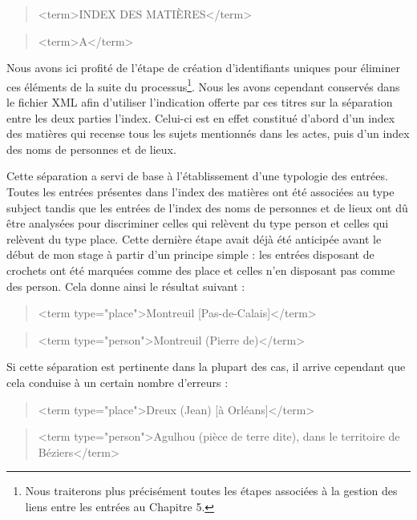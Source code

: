 \documentclass[a4paper,12pt,twoside]{book}
\begin{document}
	\begin{quotation}
		<term>INDEX DES MATIÈRES</term>
	\end{quotation}

	\begin{quotation}
		<term>A</term>
	\end{quotation}

	\noindent Nous avons ici profité de l'étape de création d'identifiants uniques pour éliminer ces éléments de la suite du processus\footnote{Nous traiterons plus précisément toutes les étapes associées à la gestion des liens entre les entrées au Chapitre 5.}. Nous les avons cependant conservés dans le fichier XML afin d'utiliser l'indication offerte par ces titres sur la séparation entre les deux parties l'index. Celui-ci est en effet constitué d'abord d'un index des matières qui recense tous les sujets mentionnés dans les actes, puis d'un index des noms de personnes et de lieux. 
	
	Cette séparation a servi de base à l'établissement d'une typologie des entrées. Toutes les entrées présentes dans l'index des matières ont été associées au type \og subject\fg{} tandis que les entrées de l'index des noms de personnes et de lieux ont dû être analysées pour discriminer celles qui relèvent du type \og person\fg{} et celles qui relèvent du type \og place\fg{}. Cette dernière étape avait déjà été anticipée avant le début de mon stage à partir d'un principe simple : les entrées disposant de crochets ont été marquées comme des \og place\fg{} et celles n'en disposant pas comme des \og person\fg{}. Cela donne ainsi le résultat suivant : 
	
	\begin{quotation}
		<term type="place">Montreuil [Pas-de-Calais]</term>
	\end{quotation}

	\begin{quotation}
		<term type="person">Montreuil (Pierre de)</term>
	\end{quotation}

	\noindent Si cette séparation est pertinente dans la plupart des cas, il arrive cependant que cela conduise à un certain nombre d'erreurs :
	
	\begin{quotation}
		<term type="place">Dreux (Jean) [à Orléans]</term>
	\end{quotation}
	
	\begin{quotation}
		<term type="person">Agulhou (pièce de terre dite), dans le territoire de
			Béziers</term>
	\end{quotation}
	
\end{document}
